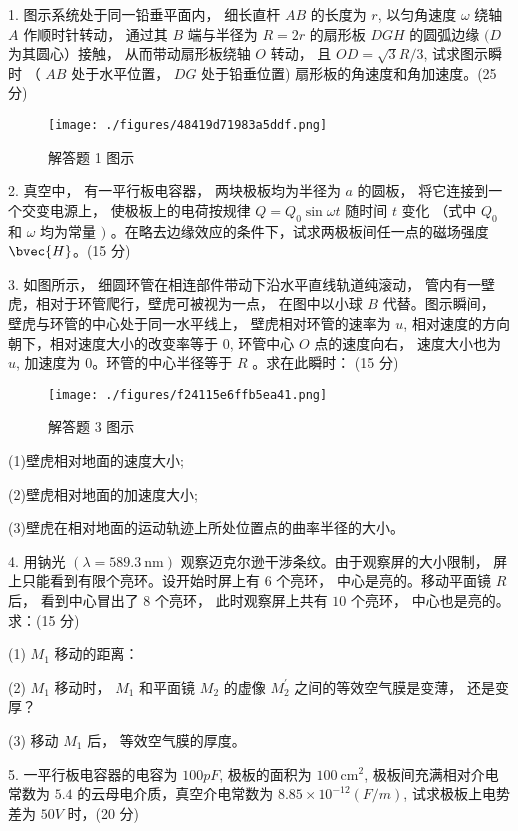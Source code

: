 
1. 图示系统处于同一铅垂平面内， 细长直杆 $A B$ 的长度为 $r$, 以匀角速度 $\omega$ 绕轴 $A$ 作顺时针转动， 通过其 $B$ 端与半径为 $R=2 r$ 的扇形板 $D G H$ 的圆弧边缘 $(D$ 为其圆心）接触， 从而带动扇形板绕轴 $O$ 转动， 且 $O D=\sqrt{3} R / 3$, 试求图示瞬时 （ $A B$ 处于水平位置， $D G$ 处于铅垂位置) 扇形板的角速度和角加速度。(25 分)

\begin{figure}[ht]
\centering
\texttt{[image: ./figures/48419d71983a5ddf.png]}
\caption{解答题 1 图示} \label{fig_FDU15_1}
\end{figure}

2. 真空中， 有一平行板电容器， 两块极板均为半径为 $a$ 的圆板， 将它连接到一个交变电源上， 使极板上的电荷按规律 $Q=Q_{0} \sin \omega t$ 随时间 $t$ 变化 （式中 $Q_{0}$ 和 $\omega$ 均为常量 $)$ 。在略去边缘效应的条件下，试求两极板间任一点的磁场强度 $\bvec{H}$。(15 分)

3. 如图所示， 细圆环管在相连部件带动下沿水平直线轨道纯滚动， 管内有一壁虎，相对于环管爬行，壁虎可被视为一点， 在图中以小球 $B$ 代替。图示瞬间， 壁虎与环管的中心处于同一水平线上， 壁虎相对环管的速率为 $u$, 相对速度的方向朝下，相对速度大小的改变率等于 $0$, 环管中心 $O$ 点的速度向右， 速度大小也为 $u$, 加速度为 $0$。环管的中心半径等于 $R$ 。求在此瞬时：
(15 分)

\begin{figure}[ht]
\centering
\texttt{[image: ./figures/f24115e6ffb5ea41.png]}
\caption{解答题 3 图示} \label{fig_FDU15_2}
\end{figure}

(1)壁虎相对地面的速度大小;

(2)壁虎相对地面的加速度大小;

(3)壁虎在相对地面的运动轨迹上所处位置点的曲率半径的大小。

4. 用钠光 $(\lambda=589.3 \mathrm{~nm})$ 观察迈克尔逊干涉条纹。由于观察屏的大小限制， 屏上只能看到有限个亮环。设开始时屏上有 $6$ 个亮环， 中心是亮的。移动平面镜 $R$ 后， 看到中心冒出了 $8$ 个亮环， 此时观察屏上共有 $10$ 个亮环， 中心也是亮的。求：(15 分)

(1) $M_{1}$ 移动的距离：

(2) $M_{1}$ 移动时， $M_{1}$ 和平面镜 $M_{2}$ 的虚像 $M_{2}^{\prime}$ 之间的等效空气膜是变薄， 还是变厚？

(3) 移动 $M_{1}$ 后， 等效空气膜的厚度。

5. 一平行板电容器的电容为 $100 p F$, 极板的面积为 $100 \mathrm{~cm}^{2}$, 极板间充满相对介电常数为 $5.4$ 的云母电介质，真空介电常数为 $8.85 \times 10^{-12}(F / m)$, 试求极板上电势差为 $50 V$ 时，(20 分)

